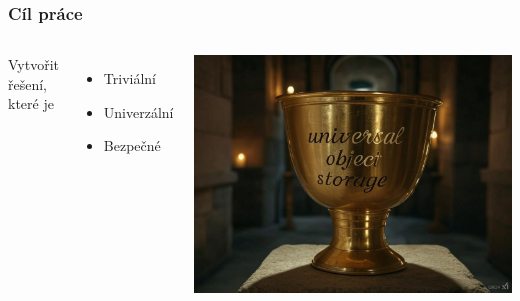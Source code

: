 
\begin{frame}
  \frametitle{Cíl práce}
  \begin{columns}
    Vytvořit řešení, které je
    \begin{itemize}
        \item Triviální
        \item Univerzální
        \item Bezpečné
    \end{itemize}
     
        \includegraphics[width=\textwidth]{img/universal-object-storage-3.jpg}
  \end{columns}
\end{frame}




